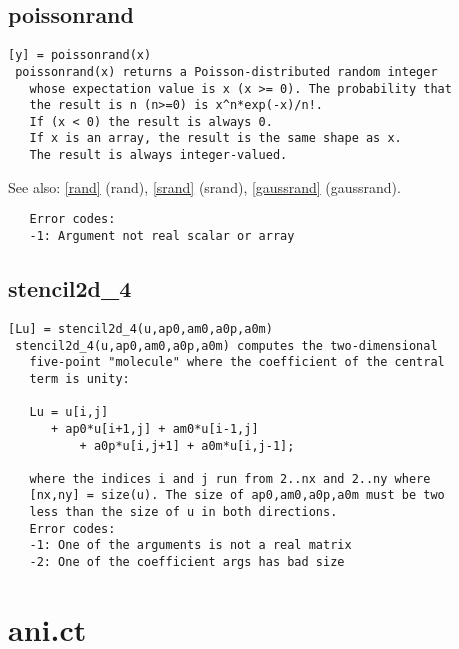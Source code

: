 \documentclass[a4paper]{article}
\begin{document}
\subsection{poissonrand\label{poissonrand}}

\begin{tscreen}
\begin{verbatim}
[y] = poissonrand(x)
 poissonrand(x) returns a Poisson-distributed random integer
   whose expectation value is x (x >= 0). The probability that
   the result is n (n>=0) is x^n*exp(-x)/n!.
   If (x < 0) the result is always 0.
   If x is an array, the result is the same shape as x.
   The result is always integer-valued.
\end{verbatim}

See also: \ref{rand} {(rand)}, \ref{srand} {(srand)}, \ref{gaussrand} {(gaussrand)}.
\begin{verbatim}
   Error codes:
   -1: Argument not real scalar or array
\end{verbatim}
\end{tscreen}



\subsection{stencil2d\_4\label{stencil2d_4}}

\begin{tscreen}
\begin{verbatim}
[Lu] = stencil2d_4(u,ap0,am0,a0p,a0m)
 stencil2d_4(u,ap0,am0,a0p,a0m) computes the two-dimensional
   five-point "molecule" where the coefficient of the central
   term is unity:

   Lu = u[i,j]
      + ap0*u[i+1,j] + am0*u[i-1,j]
          + a0p*u[i,j+1] + a0m*u[i,j-1];

   where the indices i and j run from 2..nx and 2..ny where
   [nx,ny] = size(u). The size of ap0,am0,a0p,a0m must be two
   less than the size of u in both directions.
   Error codes:
   -1: One of the arguments is not a real matrix
   -2: One of the coefficient args has bad size
\end{verbatim}
\end{tscreen}





\section{ani.ct}
\end{document}
